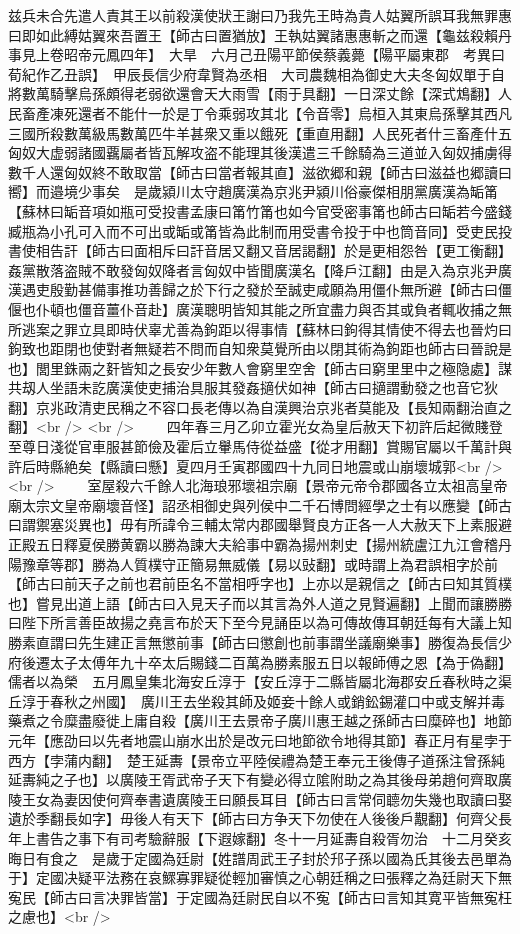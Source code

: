 兹兵未合先遣人責其王以前殺漢使狀王謝曰乃我先王時為貴人姑翼所誤耳我無罪惠曰即如此縛姑翼來吾置王【師古曰置猶放】王執姑翼諸惠惠斬之而還【龜兹殺賴丹事見上卷昭帝元鳳四年】　大旱　六月己丑陽平節侯蔡義薨【陽平屬東郡　考異曰荀紀作乙丑誤】　甲辰長信少府韋賢為丞相　大司農魏相為御史大夫冬匈奴單于自將數萬騎擊烏孫頗得老弱欲還會天大雨雪【雨于具翻】一日深丈餘【深式鴆翻】人民畜產凍死還者不能什一於是丁令乘弱攻其北【令音零】烏桓入其東烏孫擊其西凡三國所殺數萬級馬數萬匹牛羊甚衆又重以餓死【重直用翻】人民死者什三畜產什五匈奴大虚弱諸國覊屬者皆瓦解攻盗不能理其後漢遣三千餘騎為三道並入匈奴捕虜得數千人還匈奴終不敢取當【師古曰當者報其直】滋欲郷和親【師古曰滋益也郷讀曰嚮】而邉境少事矣　是歲潁川太守趙廣漢為京兆尹潁川俗豪傑相朋黨廣漢為缿筩【蘇林曰缿音項如瓶可受投書孟康曰筩竹筩也如今官受密事筩也師古曰缿若今盛錢臧瓶為小孔可入而不可出或缿或筩皆為此制而用受書令投于中也筒音同】受吏民投書使相告訐【師古曰面相斥曰訐音居又翻又音居謁翻】於是更相怨咎【更工衡翻】姦黨散落盗賊不敢發匈奴降者言匈奴中皆聞廣漢名【降戶江翻】由是入為京兆尹廣漢遇吏殷勤甚備事推功善歸之於下行之發於至誠吏咸願為用僵仆無所避【師古曰僵偃也仆頓也僵音薑仆音赴】廣漢聰明皆知其能之所宜盡力與否其或負者輒收捕之無所逃案之罪立具即時伏辜尤善為鉤距以得事情【蘇林曰鉤得其情使不得去也晉灼曰鉤致也距閉也使對者無疑若不問而自知衆莫覺所由以閉其術為鉤距也師古曰晉說是也】閭里銖兩之姧皆知之長安少年數人會窮里空舍【師古曰窮里里中之極隐處】謀共刼人坐語未訖廣漢使吏捕治具服其發姦擿伏如神【師古曰擿謂動發之也音它狄翻】京兆政清吏民稱之不容口長老傳以為自漢興治京兆者莫能及【長知兩翻治直之翻】<br />
<br />
　　四年春三月乙卯立霍光女為皇后赦天下初許后起微賤登至尊日淺從官車服甚節儉及霍后立轝馬侍從益盛【從才用翻】賞賜官屬以千萬計與許后時縣絶矣【縣讀曰懸】夏四月壬寅郡國四十九同日地震或山崩壞城郭<br />
<br />
　　室屋殺六千餘人北海琅邪壞祖宗廟【景帝元帝令郡國各立太祖高皇帝廟太宗文皇帝廟壞音怪】詔丞相御史與列侯中二千石博問經學之士有以應變【師古曰謂禦塞災異也】毋有所諱令三輔太常内郡國舉賢良方正各一人大赦天下上素服避正殿五日釋夏侯勝黄霸以勝為諫大夫給事中霸為揚州刺史【揚州統盧江九江會稽丹陽豫章等郡】勝為人質樸守正簡易無威儀【易以䜴翻】或時謂上為君誤相字於前【師古曰前天子之前也君前臣名不當相呼字也】上亦以是親信之【師古曰知其質樸也】嘗見出道上語【師古曰入見天子而以其言為外人道之見賢遍翻】上聞而讓勝勝曰陛下所言善臣故揚之堯言布於天下至今見誦臣以為可傳故傳耳朝廷每有大議上知勝素直謂曰先生建正言無懲前事【師古曰懲創也前事謂坐議廟樂事】勝復為長信少府後遷太子太傅年九十卒太后賜錢二百萬為勝素服五日以報師傅之恩【為于偽翻】儒者以為榮　五月鳳皇集北海安丘淳于【安丘淳于二縣皆屬北海郡安丘春秋時之渠丘淳于春秋之州國】　廣川王去坐殺其師及姬妾十餘人或銷鈆錫灌口中或支解并毒藥煮之令糜盡廢徙上庸自殺【廣川王去景帝子廣川惠王越之孫師古曰糜碎也】地節元年【應劭曰以先者地震山崩水出於是改元曰地節欲令地得其節】春正月有星孛于西方【孛蒲内翻】　楚王延夀【景帝立平陸侯禮為楚王奉元王後傳子道孫注曾孫純延夀純之子也】以廣陵王胥武帝子天下有變必得立隂附助之為其後母弟趙何齊取廣陵王女為妻因使何齊奉書遺廣陵王曰願長耳目【師古曰言常伺聼勿失幾也取讀曰娶遺於季翻長如字】毋後人有天下【師古曰方争天下勿使在人後後戶覯翻】何齊父長年上書告之事下有司考驗辭服【下遐嫁翻】冬十一月延夀自殺胥勿治　十二月癸亥晦日有食之　是歲于定國為廷尉【姓譜周武王子封於䢴子孫以國為氏其後去邑單為于】定國决疑平法務在哀鰥寡罪疑從輕加審慎之心朝廷稱之曰張釋之為廷尉天下無寃民【師古曰言决罪皆當】于定國為廷尉民自以不寃【師古曰言知其寛平皆無寃枉之慮也】<br />
